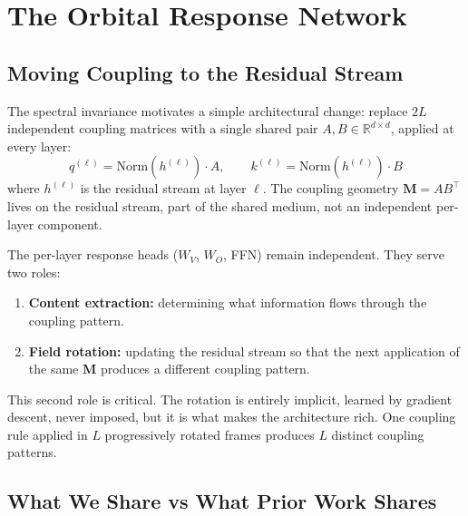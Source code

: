 \documentclass[11pt, a4paper]{article}
\newcommand{\M}{\mathbf{M}}
\newcommand{\R}{\mathbb{R}}
\theoremstyle{plain}
\theoremstyle{remark}
\begin{document}
\section{The Orbital Response Network}

\subsection{Moving Coupling to the Residual Stream}

The spectral invariance motivates a simple architectural change: replace $2L$ independent coupling matrices with a single shared pair $A, B \in \R^{d \times d}$, applied at every layer:
\begin{equation}
    q^{(\ell)} = \text{Norm}(h^{(\ell)}) \cdot A, \qquad k^{(\ell)} = \text{Norm}(h^{(\ell)}) \cdot B
\end{equation}
where $h^{(\ell)}$ is the residual stream at layer $\ell$.
The coupling geometry $\M = AB^\top$ lives on the residual stream, part of the shared medium, not an independent per-layer component.

The per-layer response heads ($W_V$, $W_O$, FFN) remain independent.
They serve two roles:
\begin{enumerate}[nosep]
    \item \textbf{Content extraction:} determining what information flows through the coupling pattern.
    \item \textbf{Field rotation:} updating the residual stream so that the next application of the same $\M$ produces a different coupling pattern.
\end{enumerate}

This second role is critical.
The rotation is entirely implicit, learned by gradient descent, never imposed, but it is what makes the architecture rich.
One coupling rule applied in $L$ progressively rotated frames produces $L$ distinct coupling patterns.



\subsection{What We Share vs What Prior Work Shares}
\end{document}
